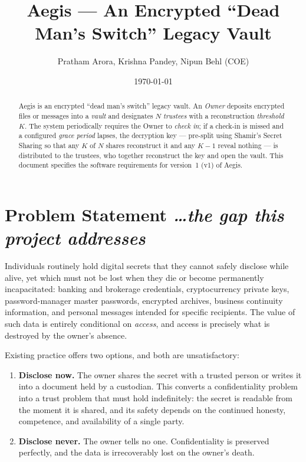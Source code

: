 \documentclass[11pt,a4paper]{article}
\title{Aegis --- An Encrypted ``Dead Man's Switch'' Legacy Vault}
\author{
  Pratham Arora, Krishna Pandey, Nipun Behl (COE)
}
\date{\today}
\newcommand{\BvrHint}[1]{%
  {\normalfont\normalsize\itshape\hfill #1}}
\begin{document}
\maketitle

\begin{abstract}
  \noindent Aegis is an encrypted ``dead man's switch'' legacy vault. An
  \emph{Owner} deposits encrypted files or messages into a \emph{vault} and
  designates $N$ \emph{trustees} with a reconstruction \emph{threshold} $K$.
  The system periodically requires the Owner to \emph{check in}; if a check-in
  is missed and a configured \emph{grace period} lapses, the decryption key
  --- pre-split using Shamir's Secret Sharing so that any $K$ of $N$ shares
  reconstruct it and any $K-1$ reveal nothing --- is distributed to the
  trustees, who together reconstruct the key and open the vault. This document
  specifies the software requirements for version~1 (v1) of Aegis.
\end{abstract}

\section{Problem Statement \BvrHint{\ldots the gap this project addresses}}
Individuals routinely hold digital secrets that they cannot safely disclose while
alive, yet which must not be lost when they die or become permanently
incapacitated: banking and brokerage credentials, cryptocurrency private keys,
password-manager master passwords, encrypted archives, business continuity
information, and personal messages intended for specific recipients. The value of
such data is entirely conditional on \emph{access}, and access is precisely what
is destroyed by the owner's absence.

Existing practice offers two options, and both are unsatisfactory:
\begin{enumerate}[leftmargin=0.9cm,label=(\alph*)]
  \item \textbf{Disclose now.} The owner shares the secret with a trusted person
    or writes it into a document held by a custodian. This converts a
    confidentiality problem into a trust problem that must hold indefinitely: the
    secret is readable from the moment it is shared, and its safety depends on the
    continued honesty, competence, and availability of a single party.
  \item \textbf{Disclose never.} The owner tells no one. Confidentiality is
    preserved perfectly, and the data is irrecoverably lost on the owner's death.
\end{enumerate}
\end{document}
